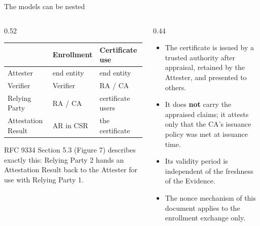 \documentclass[aspectratio=169,10pt]{beamer}
\begin{document}
\begin{frame}{The models can be nested}
  \begin{columns}[T,onlytextwidth]
    \begin{column}{0.52\textwidth}
      \small
      \begin{tabular}{@{}p{2.7cm}p{2.0cm}p{2.5cm}@{}}
        \toprule
        & \textbf{Enrollment} & \textbf{Certificate use}\\
        \midrule
        Attester & end entity & end entity\\
        Verifier & Verifier & RA / CA\\
        Relying Party & RA / CA & certificate users\\
        Attestation Result & AR in CSR & the certificate\\
        \bottomrule
      \end{tabular}
      \vspace{0.3cm}

      RFC 9334 Section 5.3 (Figure 7) describes exactly this: Relying Party 2
      hands an Attestation Result back to the Attester for use with Relying
      Party 1.
    \end{column}
    \begin{column}{0.44\textwidth}
      \begin{itemize}
        \item The certificate is issued by a trusted authority after appraisal,
              retained by the Attester, and presented to others.
        \item It does \textbf{not} carry the appraised claims; it attests only
              that the CA's issuance policy was met at issuance time.
        \item Its validity period is independent of the freshness of the
              Evidence.
        \item The nonce mechanism of this document applies to the enrollment
              exchange only.
      \end{itemize}
    \end{column}
  \end{columns}
\end{frame}
\end{document}
